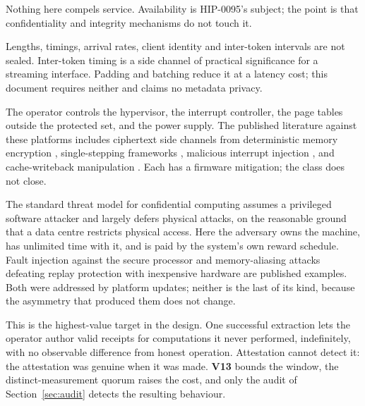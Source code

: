 \documentclass[11pt,a4paper]{article}
\newcommand{\req}[1]{\textbf{#1}}
\begin{document}
\begin{description}[leftmargin=1.4em]
\item[Refuse, delay and select.] Nothing here compels service. Availability is
HIP-0095's subject; the point is that confidentiality and integrity mechanisms do
not touch it.
\item[Read the metadata.] Lengths, timings, arrival rates, client identity and
inter-token intervals are not sealed. Inter-token timing is a side channel of
practical significance for a streaming interface. Padding and batching reduce it at
a latency cost; this document requires neither and claims no metadata privacy.
\item[Attack the environment from below.] The operator controls the hypervisor, the
interrupt controller, the page tables outside the protected set, and the power
supply. The published literature against these platforms includes ciphertext side
channels from deterministic memory encryption \cite{cipherleaks}, single-stepping
frameworks \cite{sevstep}, malicious interrupt injection \cite{heckler,wesee}, and
cache-writeback manipulation \cite{cachewarp}. Each has a firmware mitigation; the
class does not close.
\item[Attack the machine physically.] The standard threat model for confidential
computing assumes a privileged software attacker and largely defers physical
attacks, on the reasonable ground that a data centre restricts physical access. Here
the adversary owns the machine, has unlimited time with it, and is paid by the
system's own reward schedule. Fault injection against the secure processor
\cite{buhren2021} and memory-aliasing attacks defeating replay protection with
inexpensive hardware \cite{badram} are published examples. Both were addressed by
platform updates; neither is the last of its kind, because the asymmetry that
produced them does not change.
\item[Extract $sk_r$, once.] This is the highest-value target in the design. One
successful extraction lets the operator author valid receipts for computations it
never performed, indefinitely, with no observable difference from honest operation.
Attestation cannot detect it: the attestation was genuine when it was made.
\req{V13} bounds the window, the distinct-measurement quorum raises the cost, and
only the audit of Section~\ref{sec:audit} detects the resulting behaviour.
\end{description}

\end{document}
